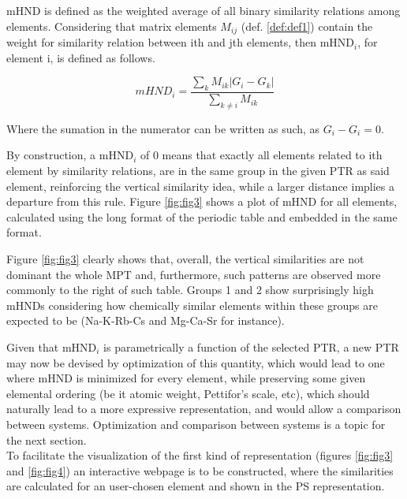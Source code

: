 \documentclass[article]{article}
\begin{document}
\begin{definition}
\label{def:def4}
mHND is defined as the weighted average of all binary similarity relations among elements. Considering that matrix elements $M_{ij}$ (def. \ref{def:def1}) contain the weight for similarity relation between ith and jth elements, then mHND$_i$, for element i, is defined as follows.

	\begin{equation}
		mHND_{i} = \frac{\sum_k M_{ik} | G_i - G_k |}{\sum_{k \neq i} M_{ik}}
	\end{equation}
	
Where the sumation in the numerator can be written as such, as $G_i - G_i = 0$.
\end{definition}

By construction, a mHND$_i$ of 0 means that exactly all elements related to ith element by similarity relations, are in the same group in the given PTR as said element, reinforcing the vertical similarity idea, while a larger distance implies a departure from this rule. Figure \ref{fig:fig3} shows a plot of mHND for all elements, calculated using the long format of the periodic table and embedded in the same format.


Figure \ref{fig:fig3} clearly shows that, overall, the vertical similarities are not dominant the whole MPT and, furthermore, such patterns are observed more commonly to the right of such table. Groups 1 and 2 show surprisingly high mHNDs considering how chemically similar elements within these groups are expected to be (Na-K-Rb-Cs and Mg-Ca-Sr for instance). 

Given that mHND$_i$ is parametrically a function of the selected PTR, a new PTR may now be devised by optimization of this quantity, which would lead to one where mHND is minimized for every element, while preserving some given elemental ordering (be it atomic weight, Pettifor's scale, etc), which should naturally lead to a more expressive representation, and would allow a comparison between systems. Optimization and comparison between systems is a topic for the next section.\\



To facilitate the visualization of the first kind of representation (figures \ref{fig:fig3} and \ref{fig:fig4}) an interactive webpage is to be constructed, where the similarities are calculated for an user-chosen element and shown in the PS representation.
 
 

\renewcommand\refname{References}


\end{document}
